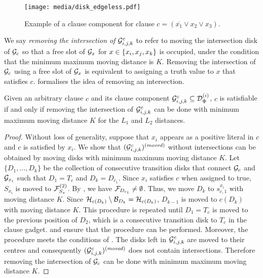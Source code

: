 \begin{toappendix}
\begin{toappendix}
\begin{figure}[!htb]
    \centering
    \texttt{[image: media/disk\_edgeless.pdf]}
    \caption{Example of a clause component for clause $c = (\overline{x_1} \lor x_2 \lor x_3)$.}
    \label{fig:component}
\end{figure}

We say \emph{removing the intersection of} $\mathcal{G}^c_{i,j,k}$ to refer to moving the intersection disk of $\mathcal{G}_c$ so that a free slot of $\mathcal{G}_x$ for $x\in \{x_i,x_j,x_k\}$ is occupied, under the condition that the minimum maximum moving distance is $K$.
Removing the intersection of $\mathcal{G}_c$ using a free slot of $\mathcal{G}_x$ is equivalent to assigning a truth value to $x$ that satisfies $c$.
 formalises the idea of removing an intersection.

\begin{mlemmarep}\label{lem:clause_satisfiable_md_k}
    Given an arbitrary clause $c$ and its clause component $\mathcal{G}^c_{i,j,k} \subseteq \mathcal{D}^{(i)}_\Phi$, $c$ is satisfiable if and only if removing the intersection of $\mathcal{G}^c_{i,j,k}$ can be done with minimum maximum moving distance $K$ for the $L_1$ and $L_2$ distances.
\end{mlemmarep}

\begin{proof}
    Without loss of generality, suppose that $x_i$ appears as a positive literal in $c$ and $c$ is satisfied by $x_i$.
    We show that $(\mathcal{G}^c_{i,j,k})^{(\mathit{moved})}$ without intersections can be obtained by moving disks with minimum maximum moving distance $K$.
    Let $\{D_1,\ldots,D_k\}$ be the collection of consecutive transition disks that connect $\mathcal{G}_c$ and $\mathcal{G}_{x_i}$ such that $D_1 = T_c$ and $D_k = D_{c_1}$.
    Since $x_i$ satisfies $c$ when assigned to true, $S_{x_i}$ is moved to $\mathcal{F}_{S_x}^{(2)}$.
    By , we have $\mathcal{F}_{D_{c_1}}\neq \emptyset$.
    Thus, we move $D_k$ to $s^{x_i}_{c,1}$ with moving distance $K$.
    Since $\mathcal{H}_{c(D_k)} \setminus \mathcal{B}_{D_k} = \mathcal{H}_{c(D_k)}$,
    $D_{k-1}$ is moved to $c(D_k)$ with moving distance $K$.
    This procedure is repeated until $D_1 = T_c$ is moved to the previous position of $D_2$, which is a consecutive transition disk to $T_c$ in the clause gadget.
     and  ensure that the procedure can be performed.
    Moreover, the procedure meets the conditions of .
    The disks left in $\mathcal{G}^c_{i,j,k}$ are moved to their centres and consequently $(\mathcal{G}^c_{i,j,k})^{(\mathit{moved})}$ does not contain intersections.
    Therefore removing the intersection of $\mathcal{G}_c$ can be done with minimum maximum moving distance $K$.


\end{proof}
\end{toappendix}
\end{toappendix}
